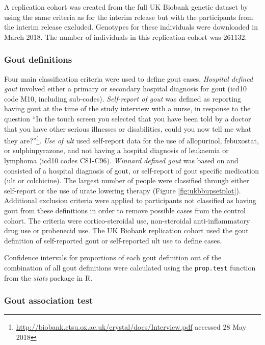 \documentclass[twoside,openright]{report}
\begin{document}
A replication cohort was created from the full UK Biobank genetic
dataset by using the same criteria as for the interim release but with
the participants from the interim release excluded. Genotypes for these
individuals were downloaded in March 2018. The number of individuals in
this replication cohort was 261132.

\subsubsection{Gout definitions}\label{gout-definitions}

Four main classification criteria were used to define gout cases.
\emph{Hospital defined gout} involved either a primary or secondary
hospital diagnosis for gout (\gls{icd10} code M10, including sub-codes).
\emph{Self-report of gout} was defined as reporting having gout at the
time of the study interview with a nurse, in response to the question
``In the touch screen you selected that you have been told by a doctor
that you have other serious illnesses or disabilities, could you now
tell me what they are?''\footnote{\url{http://biobank.ctsu.ox.ac.uk/crystal/docs/Interview.pdf}
  accessed 28 May 2018}. \emph{Use of \gls{ult}} used self-report data
for the use of allopurinol, febuxostat, or sulphinpyrazone, and not
having a hospital diagnosis of leukaemia or lymphoma (\gls{icd10} codes
C81-C96). \emph{Winnard defined gout} was based on \citet{Winnard2012}
and consisted of a hospital diagnosis of gout, or self-report of gout
specific medication (\gls{ult} or colchicine). The largest number of
people were classified through either self-report or the use of urate
lowering therapy (Figure \ref{fig:ukbbupsetplot}). Additional exclusion
criteria were applied to participants not classified as having gout from
these definitions in order to remove possible cases from the control
cohort. The criteria were cortico-steroidal use, non-steroidal
anti-inflammatory drug use or probenecid use. The UK Biobank replication
cohort used the gout definition of self-reported gout or self-reported
\gls{ult} use to define cases.

Confidence intervals for proportions of each gout definition out of the
combination of all gout definitions were calculated using the
\texttt{prop.test} function from the \emph{stats} package in R.

\subsubsection{Gout association test}\label{gout-association-test}
\end{document}
